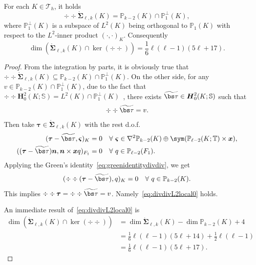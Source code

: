 \begin{lemma}\label{lem:divdivbubble}
For each $K\in\mathcal T_h$, it holds
\begin{equation}\label{eq:divdivL2local0}
\div\div\mathring{\boldsymbol \Sigma}_{\ell,k}(K)=\mathbb P_{k-2}(K)\cap \mathbb P_1^{\bot}(K),
\end{equation}
where $\mathbb P_1^{\bot}(K)$ is a subspace of $L^2(K)$ being orthogonal to $\mathbb P_1(K)$ with respect to the $L^2$-inner product $(\cdot, \cdot)_K$. Consequently
\begin{equation}\label{eq:dimdivdivbubble}
\dim(\mathring{\boldsymbol \Sigma}_{\ell,k}(K)\cap\ker(\div\div))=\frac{1}{6}\ell(\ell-1)(5\ell+17). 
\end{equation}
\end{lemma}
\begin{proof}
From the integration by parts, it is obviously true that $\div\div\mathring{\boldsymbol \Sigma}_{\ell,k}(K)\subseteq\mathbb P_{k-2}(K)\cap \mathbb P_1^{\bot}(K)$.
On the other side, for any $v\in\mathbb P_{k-2}(K)\cap \mathbb P_1^{\bot}(K)$, due to the fact that $\div\div \boldsymbol H_0^2(K;\mathbb S)=L^2(K)\cap \mathbb P_1^{\bot}(K)$~\cite{CostabelMcIntosh2010}, 
there exists $\widetilde{\bs\tau}\in\boldsymbol H_0^2(K;\mathbb S)$ such that
\[
\div\div\widetilde{\bs\tau}=v. %
\]
Then take $\boldsymbol \tau \in\mathring{\boldsymbol \Sigma}_{\ell,k}(K)$ with the rest d.o.f. 
\begin{align*}
(\boldsymbol \tau-\widetilde{\bs\tau}, \boldsymbol \varsigma)_K=0&  \quad\forall~\boldsymbol \varsigma\in\nabla^2\mathbb P_{k-2}(K)\oplus\sym(\mathbb P_{\ell-2}(K; \mathbb T)\times\boldsymbol x), \\
((\boldsymbol \tau-\widetilde{\bs\tau})\boldsymbol n, \boldsymbol  n\times \boldsymbol x q)_{F_1}=0 &\quad\forall~q\in\mathbb P_{\ell-2}(F_1).
\end{align*}
Applying the Green's identity~\eqref{eq:greenidentitydivdiv}, we get
\[
(\div\div(\boldsymbol \tau-\widetilde{\bs\tau}), q)_K=0\quad\forall~q\in\mathbb P_{k-2}(K).
\]
This implies $\div\div\boldsymbol \tau=\div\div\widetilde{\bs\tau}=v$. Namely~\eqref{eq:divdivL2local0} holds.

An immediate result of~\eqref{eq:divdivL2local0} is
\begin{align*}
\dim(\mathring{\boldsymbol \Sigma}_{\ell,k}(K)\cap\ker(\div\div))& =\dim\mathring{\boldsymbol \Sigma}_{\ell,k}(K)-\dim\mathbb P_{k-2}(K)+4 \\
&=\frac{1}{6}\ell(\ell-1)(5\ell+14) +\frac{1}{2}\ell(\ell-1)\\
&=\frac{1}{6}\ell(\ell-1)(5\ell+17).
\end{align*}
\end{proof}


